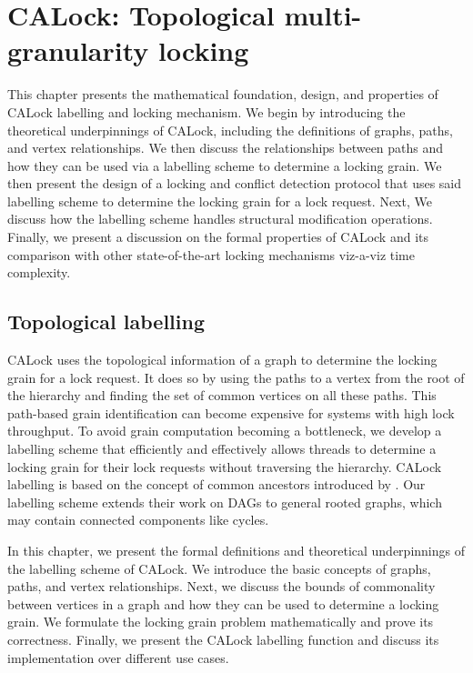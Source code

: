 

\chapter{CALock: Topological multi-granularity locking} \label{chap:CALock}
\minitoc

This chapter presents the mathematical foundation, design, and properties of CALock labelling and locking mechanism. We begin by introducing the theoretical underpinnings of CALock, including the definitions of graphs, paths, and vertex relationships. We then discuss the relationships between paths and how they can be used via a labelling scheme to determine a locking grain. We then present the design of a locking and conflict detection protocol that uses said labelling scheme to determine the locking grain for a lock request. Next, We discuss how the labelling scheme handles structural modification operations. Finally, we present a discussion on the formal properties of CALock and its comparison with other state-of-the-art locking mechanisms viz-a-viz time complexity.


\section{Topological labelling} \label{chap:theory}

CALock uses the topological information of a graph to determine the locking grain for a lock request. It does so by using the paths to a vertex from the root of the hierarchy and finding the set of common vertices on all these paths. This path-based grain identification can become expensive for systems with high lock throughput. To avoid grain computation becoming a bottleneck, we develop a labelling scheme that efficiently and effectively allows threads to determine a locking grain for their lock requests without traversing the hierarchy. CALock labelling is based on the concept of common ancestors introduced by \citet{fischer2010new}. Our labelling scheme extends their work on DAGs to general rooted graphs, which may contain connected components like cycles. 

In this chapter, we present the formal definitions and theoretical underpinnings of the labelling scheme of CALock.
We introduce the basic concepts of graphs, paths, and vertex relationships.
Next, we discuss the bounds of commonality between vertices in a graph and how they can be used to determine a locking grain. We formulate the locking grain problem mathematically and prove its correctness. Finally, we present the CALock labelling function and discuss its implementation over different use cases.

